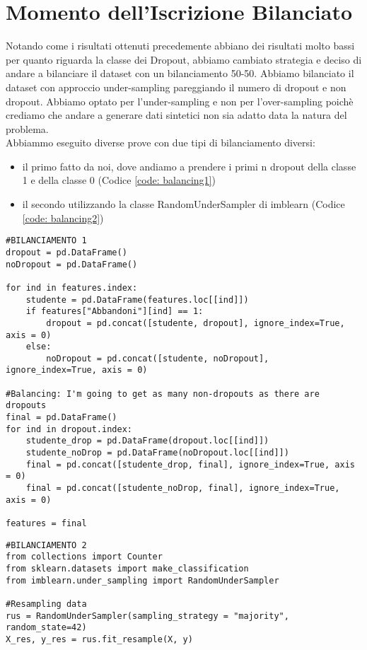 \documentclass[../../Report.tex]{subfiles}
\begin{document}
\section{Momento dell'Iscrizione Bilanciato}
\label{sec: balanced}
Notando come i risultati ottenuti precedemente abbiano dei risultati molto bassi per quanto riguarda la classe dei Dropout, abbiamo cambiato strategia e deciso di andare a bilanciare il dataset con un bilanciamento 50-50. 
Abbiamo bilanciato il dataset con approccio under-sampling pareggiando il numero di dropout e non dropout. Abbiamo optato per l'under-sampling e non per l'over-sampling poichè crediamo che andare a generare dati sintetici non sia adatto data la natura del problema. \\
Abbiammo eseguito diverse prove con due tipi di bilanciamento diversi:
\begin{itemize}
    \item il primo fatto da noi, dove andiamo a prendere i primi n dropout della classe 1 e della classe 0 (Codice \ref{code: balancing1})
    \item il secondo utilizzando la classe RandomUnderSampler di imblearn (Codice \ref{code: balancing2})
\end{itemize}

\begin{lstlisting}[caption={Primo bilanciamento "a mano"}, label={code: balancing1}]
#BILANCIAMENTO 1
dropout = pd.DataFrame()
noDropout = pd.DataFrame()

for ind in features.index:
    studente = pd.DataFrame(features.loc[[ind]])
    if features["Abbandoni"][ind] == 1:
        dropout = pd.concat([studente, dropout], ignore_index=True, axis = 0)
    else:
        noDropout = pd.concat([studente, noDropout], ignore_index=True, axis = 0)

#Balancing: I'm going to get as many non-dropouts as there are dropouts
final = pd.DataFrame()
for ind in dropout.index:
    studente_drop = pd.DataFrame(dropout.loc[[ind]])
    studente_noDrop = pd.DataFrame(noDropout.loc[[ind]])
    final = pd.concat([studente_drop, final], ignore_index=True, axis = 0)
    final = pd.concat([studente_noDrop, final], ignore_index=True, axis = 0)

features = final
\end{lstlisting}

\begin{lstlisting}[caption={Secondo bilanciamento tramite RandomUnderSampler}, label={code: balancing2}]
#BILANCIAMENTO 2
from collections import Counter
from sklearn.datasets import make_classification
from imblearn.under_sampling import RandomUnderSampler

#Resampling data
rus = RandomUnderSampler(sampling_strategy = "majority", random_state=42)
X_res, y_res = rus.fit_resample(X, y)
\end{lstlisting}
\end{document}
